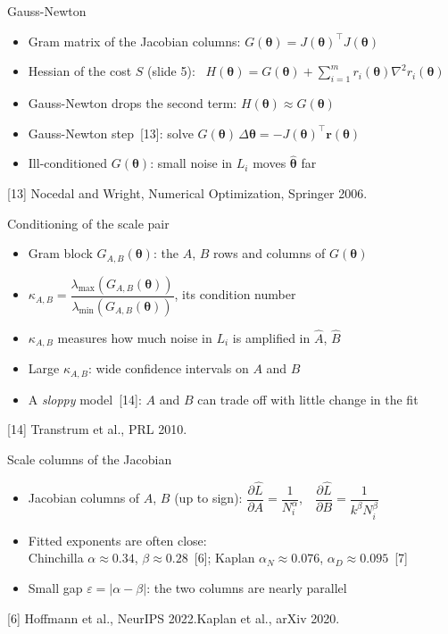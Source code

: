\documentclass[aspectratio=169,11pt]{beamer}
\newcommand{\slidecite}[1]{\vfill{\tiny\color{gray}#1\par}}
\begin{document}
\begin{frame}{Gauss-Newton}
  \begin{itemize}\setlength{\itemsep}{10pt}
    \item Gram matrix of the Jacobian columns: $G(\boldsymbol{\theta}) = J(\boldsymbol{\theta})^\top J(\boldsymbol{\theta})$
    \item Hessian of the cost $S$ (slide 5): \ $H(\boldsymbol{\theta}) = G(\boldsymbol{\theta}) + \sum_{i=1}^{m} r_i(\boldsymbol{\theta}) \nabla^2 r_i(\boldsymbol{\theta})$
    \item Gauss-Newton drops the second term: $H(\boldsymbol{\theta}) \approx G(\boldsymbol{\theta})$
    \item Gauss-Newton step~[13]: solve $G(\boldsymbol{\theta})\,\Delta\boldsymbol{\theta} = -J(\boldsymbol{\theta})^\top \mathbf{r}(\boldsymbol{\theta})$
    \item Ill-conditioned $G(\boldsymbol{\theta})$: small noise in $L_i$ moves $\hat{\boldsymbol{\theta}}$ far
  \end{itemize}
  \slidecite{[13] Nocedal and Wright, Numerical Optimization, Springer 2006.}
\end{frame}

\begin{frame}{Conditioning of the scale pair}
  \begin{itemize}\setlength{\itemsep}{14pt}
    \item Gram block $G_{A,B}(\boldsymbol{\theta})$: the $A$, $B$ rows and columns of $G(\boldsymbol{\theta})$
    \item $\kappa_{A,B} = \dfrac{\lambda_{\max}(G_{A,B}(\boldsymbol{\theta}))}{\lambda_{\min}(G_{A,B}(\boldsymbol{\theta}))}$, its condition number
    \item $\kappa_{A,B}$ measures how much noise in $L_i$ is amplified in $\hat{A}$, $\hat{B}$
    \item Large $\kappa_{A,B}$: wide confidence intervals on $A$ and $B$
    \item A \emph{sloppy} model~[14]: $A$ and $B$ can trade off with little change in the fit
  \end{itemize}
  \slidecite{[14] Transtrum et al., PRL 2010.}
\end{frame}

\begin{frame}{Scale columns of the Jacobian}
  \begin{itemize}\setlength{\itemsep}{10pt}
    \item Jacobian columns of $A$, $B$ (up to sign):\quad
      $\dfrac{\partial \hat{L}}{\partial A} = \dfrac{1}{N_i^{\alpha}}$,\ \ $\dfrac{\partial \hat{L}}{\partial B} = \dfrac{1}{k^{\beta} N_i^{\beta}}$
    \item Fitted exponents are often close:\\
      Chinchilla $\alpha \approx 0.34$, $\beta \approx 0.28$~[6]; Kaplan $\alpha_N \approx 0.076$, $\alpha_D \approx 0.095$~[7]
    \item Small gap $\varepsilon = |\alpha - \beta|$: the two columns are nearly parallel
  \end{itemize}
  \slidecite{[6] Hoffmann et al., NeurIPS 2022.\quad [7] Kaplan et al., arXiv 2020.}
\end{frame}
\end{document}
